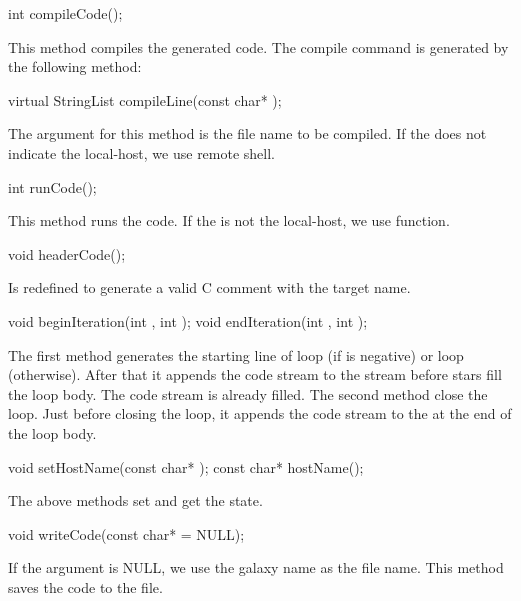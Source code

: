 \begin{example}
int compileCode();
\end{example}

This method compiles the generated code. The compile command is generated
by the following method:

\begin{example}
virtual StringList compileLine(const char* );
\end{example}

The argument for this method is the file name to be compiled. If the
 does not indicate the local-host, we use remote
shell.

\begin{example}
int runCode();
\end{example}

This method runs the code. If the  is not the
local-host, we use  function.

\begin{example}
void headerCode();
\end{example}

Is redefined to generate a valid C comment with the target name.

\begin{example}
void beginIteration(int , int );
void endIteration(int , int );
\end{example}

The first method generates the starting line of  loop
(if  is negative) or  loop (otherwise).
After that it appends the  code stream to the 
stream before stars fill the loop body. The  code stream
is already filled. The second method close the loop. Just before closing
the loop, it appends the  code stream to the 
at the end of the loop body.

\begin{example}
void setHostName(const char* );
const char* hostName();
\end{example}

The above methods set and get the  state.

\begin{example}
void writeCode(const char*  = NULL);
\end{example}

If the argument is NULL, we use the galaxy name as the file name.
This method saves the code to the file.

